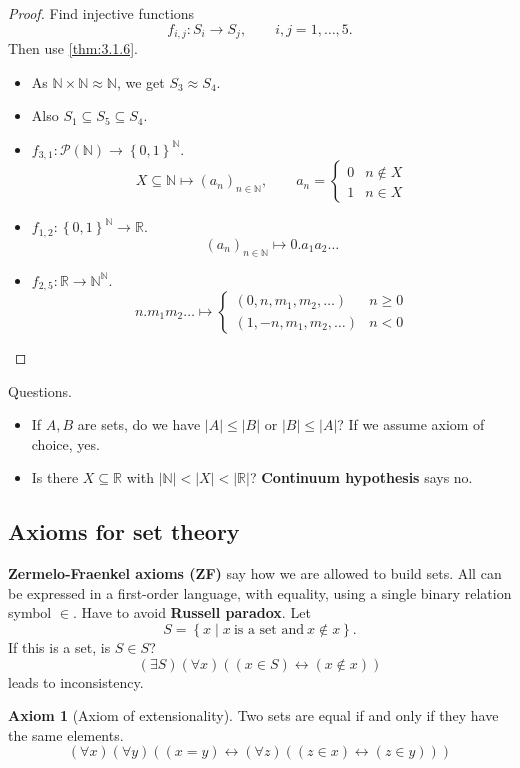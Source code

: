 \documentclass{article}
\newcommand{\N}{\mathbb{N}}
\newcommand{\R}{\mathbb{R}}
\newcommand{\rb}[1]{\left( #1 \right)}
\newcommand{\cb}[1]{\left\{ #1 \right\}}
\newcommand{\abs}[1]{\left\lvert #1 \right\rvert}
\newcommand{\iffb}[2]{\rb{#1 \leftrightarrow #2}}
\newcommand{\fab}[1]{\rb{\forall #1}}
\newcommand{\teb}[1]{\rb{\exists #1}}
\newcommand{\eqb}[2]{\rb{#1 = #2}}
\newcommand{\inb}[2]{\rb{#1 \in #2}}
\newcommand{\nib}[2]{\rb{#1 \notin #2}}
\theoremstyle{definition}\newtheorem{definition}{Definition}[subsection]
\theoremstyle{definition}\newtheorem{remark1}[definition]{Remark}
\theoremstyle{definition}\newtheorem{example1}[definition]{Example}
\theoremstyle{definition}\newtheorem*{remark2}{Remark}
\theoremstyle{definition}\newtheorem*{example2}{Example}
\theoremstyle{definition}\newtheorem*{note}{Note}
\theoremstyle{definition}\newtheorem*{notation}{Notation}
\newtheorem{axiom}{Axiom}
\begin{document}
\begin{proof}
Find injective functions
$$ f_{i, j} : S_i \to S_j, \qquad i, j = 1, \dots, 5. $$
Then use \ref{thm:3.1.6}.
\begin{itemize}
\item As $ \N \times \N \approx \N $, we get $ S_3 \approx S_4 $.
\item Also $ S_1 \subseteq S_5 \subseteq S_4 $.
\item $ f_{3, 1} : \mathcal{P}\rb{\N} \to \cb{0, 1}^\N $.
$$ X \subseteq \N \mapsto \rb{a_n}_{n \in \N}, \qquad a_n = \begin{cases}
0 & n \notin X \\
1 & n \in X
\end{cases} $$
\item $ f_{1, 2} : \cb{0, 1}^\N \to \R $.
$$ \rb{a_n}_{n \in \N} \mapsto 0 . a_1a_2 \dots $$
\item $ f_{2, 5} : \R \to \N^\N $.
$$ n . m_1m_2 \dots \mapsto \begin{cases}
\rb{0, n, m_1, m_2, \dots} & n \ge 0 \\
\rb{1, -n, m_1, m_2, \dots} & n < 0
\end{cases} $$
\end{itemize}
\end{proof}

\pagebreak

Questions.
\begin{itemize}
\item If $ A, B $ are sets, do we have $ \abs{A} \le \abs{B} $ or $ \abs{B} \le \abs{A} $? If we assume axiom of choice, yes.
\item Is there $ X \subseteq \R $ with $ \abs{\N} < \abs{X} < \abs{\R} $? \textbf{Continuum hypothesis} says no.
\end{itemize}

\subsection{Axioms for set theory}

\textbf{Zermelo-Fraenkel axioms (ZF)} say how we are allowed to build sets. All can be expressed in a first-order language, with equality, using a single binary relation symbol $ \in $. Have to avoid \textbf{Russell paradox}. Let
$$ S = \cb{x \mid x \ \text{is a set and} \ x \notin x}. $$
If this is a set, is $ S \in S $?
$$ \teb{S}\fab{x}\iffb{\inb{x}{S}}{\nib{x}{x}} $$
leads to inconsistency.

\begin{axiom}[Axiom of extensionality]
Two sets are equal if and only if they have the same elements.
$$ \fab{x}\fab{y}\iffb{\eqb{x}{y}}{\fab{z}\iffb{\inb{z}{x}}{\inb{z}{y}}} $$
\end{axiom}
\end{document}
